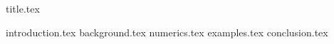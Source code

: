 \documentclass[12pt,a4paper,twoside]{article}
\begin{document}
{title.tex}

\newpage
\tableofcontents
\newpage

\pagestyle{headings}
\raggedbottom

\FloatBarrier

{introduction.tex}
{background.tex}
{numerics.tex}
{examples.tex}
{conclusion.tex}

\nocite{*}
\printbibliography[heading=bibintoc,title=References]
\newpage

\end{document}
